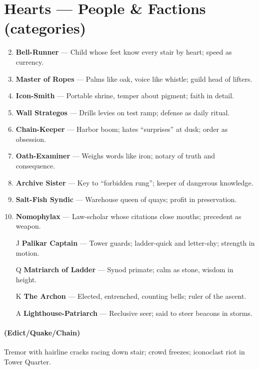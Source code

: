 \section*{Hearts --- People \& Factions (categories)}
\label{sec:thepyrgos-people}
\begin{enumerate}
\setcounter{enumi}{1}
\item \textbf{Bell-Runner} --- Child whose feet know every stair by heart; speed as currency.
\item \textbf{Master of Ropes} --- Palms like oak, voice like whistle; guild head of lifters.
\item \textbf{Icon-Smith} --- Portable shrine, temper about pigment; faith in detail.
\item \textbf{Wall Strategos} --- Drills levies on test ramp; defense as daily ritual.
\item \textbf{Chain-Keeper} --- Harbor boom; hates ``surprises'' at dusk; order as obsession.
\item \textbf{Oath-Examiner} --- Weighs words like iron; notary of truth and consequence.
\item \textbf{Archive Sister} --- Key to ``forbidden rung''; keeper of dangerous knowledge.
\item \textbf{Salt-Fish Syndic} --- Warehouse queen of quays; profit in preservation.
\item \textbf{Nomophylax} --- Law-scholar whose citations close mouths; precedent as weapon.
\item[J] \textbf{Palikar Captain} --- Tower guards; ladder-quick and letter-shy; strength in motion.
\item[Q] \textbf{Matriarch of Ladder} --- Synod primate; calm as stone, wisdom in height.
\item[K] \textbf{The Archon} --- Elected, entrenched, counting bells; ruler of the ascent.
\item[A] \textbf{Lighthouse-Patriarch} --- Reclusive seer; said to steer beacons in storms.
\end{enumerate}

\paragraph*{(Edict/Quake/Chain)} Tremor with hairline cracks racing down stair; crowd freezes; iconoclast riot in Tower Quarter.

